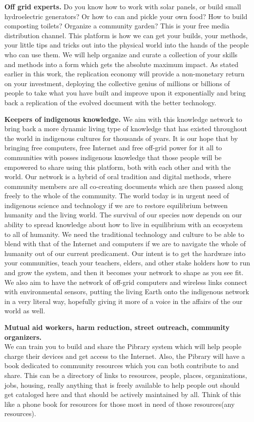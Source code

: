 \textbf{Off grid experts.} Do you know how to work with solar panels, or
build small hydroelectric generators? Or how to can and pickle your own
food? How to build composting toilets? Organize a community garden? This
is your free media distribution channel. This platform is how we can get
your builds, your methods, your little tips and tricks out into the
physical world into the hands of the people who can use them. We will
help organize and curate a collection of your skills and methods into a
form which gets the absolute maximum impact. As stated earlier in this
work, the replication economy will provide a non-monetary return on your
investment, deploying the collective genius of millions or billions of
people to take what you have built and improve upon it exponentially and
bring back a replication of the evolved document with the better
technology.

\textbf{Keepers of indigenous knowledge.} We aim with this knowledge
network to bring back a more dynamic living type of knowledge that has
existed throughout the world in indigenous cultures for thousands of
years. It is our hope that by bringing free computers, free Internet and
free off-grid power for it all to communities with posses indigenous
knowledge that those people will be empowered to share using this
platform, both with each other and with the world. Our network is a
hybrid of oral tradition and digital methods, where community members
are all co-creating documents which are then passed along freely to the
whole of the community. The world today is in urgent need of indigenous
science and technology if we are to restore equilibrium between humanity
and the living world. The survival of our species now depends on our
ability to spread knowledge about how to live in equilibrium with an
ecosystem to all of humanity. We need the traditional technology and
culture to be able to blend with that of the Internet and computers if
we are to navigate the whole of humanity out of our current predicament.
Our intent is to get the hardware into your communities, teach your
teachers, elders, and other stake holders how to run and grow the
system, and then it becomes your network to shape as you see fit. We
also aim to have the network of off-grid computers and wireless links
connect with environmental sensors, putting the living Earth onto the
indigenous network in a very literal way, hopefully giving it more of a
voice in the affairs of the our world as well.

\textbf{Mutual aid workers, harm reduction, street outreach, community
organizers.}\\
We can train you to build and share the Pibrary system which will help
people charge their devices and get access to the Internet. Also, the
Pibrary will have a book dedicated to community resources which you can
both contribute to and share. This can be a directory of links to
resources, people, places, organizations, jobs, housing, really anything
that is freely available to help people out should get cataloged here
and that should be actively maintained by all. Think of this like a
phone book for resources for those most in need of those resources(any
resources).

